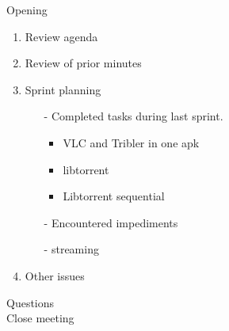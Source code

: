 \documentclass[pdftex, 12pt, a4paper]{report}
\begin{document}
\pagestyle{fancy}

Opening

\begin{enumerate}
\item Review agenda			
\item Review of prior minutes
\item Sprint planning
\begin{enumerate}
\item[-] Completed tasks during last sprint.
	\begin{itemize}
	\item VLC and Tribler in one apk
	\item libtorrent
	\item Libtorrent sequential
	\end{itemize}
\item[-] Encountered impediments
\item[-] streaming
\end{enumerate}
\item Other issues
\end{enumerate}

Questions\\

Close meeting
\end{document}
